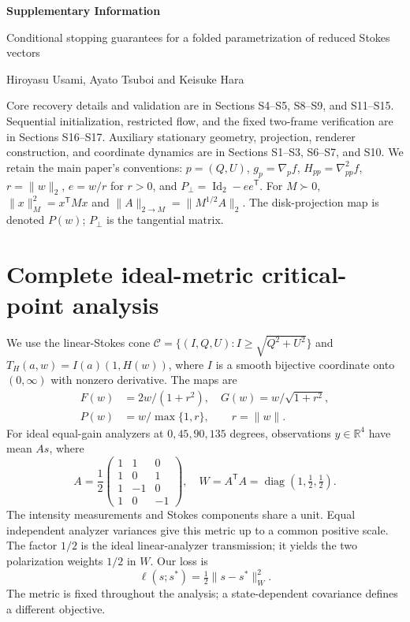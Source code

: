 
\raggedright
\begin{center}
{\Large\bfseries Supplementary Information}\par\medskip
{\large Conditional stopping guarantees for a folded parametrization of reduced Stokes vectors}\par\medskip
Hiroyasu Usami, Ayato Tsuboi and Keisuke Hara
\end{center}
\medskip
\noindent Core recovery details and validation are in Sections S4--S5, S8--S9, and S11--S15. Sequential initialization, restricted flow, and the fixed two-frame verification are in Sections S16--S17. Auxiliary stationary geometry, projection, renderer construction, and coordinate dynamics are in Sections S1--S3, S6--S7, and S10. We retain the main paper's conventions: $p=(Q,U)$, $g_p=\nabla_p f$, $H_{pp}=\nabla^2_{pp}f$, $r=\|w\|_2$, $e=w/r$ for $r>0$, and $P_\perp=\operatorname{Id}_2-ee^{\mathsf T}$. For $M\succ0$, $\|x\|_M^2=x^{\mathsf T}Mx$ and $\|A\|_{2\to M}=\|M^{1/2}A\|_2$. The disk-projection map is denoted $P(w)$; $P_\perp$ is the tangential matrix.

\section{Complete ideal-metric critical-point analysis}
\label{SI-sec:ideal}
We use the linear-Stokes cone $\mathcal C=\{(I,Q,U):I\geq\sqrt{Q^2+U^2}\}$ and $T_H(a,w)=I(a)(1,H(w))$, where $I$ is a smooth bijective coordinate onto $(0,\infty)$ with nonzero derivative. The maps are
\begin{equation}
 \begin{aligned}
 F(w)&=2w/(1+r^2),\quad G(w)=w/\sqrt{1+r^2},\\
 P(w)&=w/\max\{1,r\},\qquad r=\|w\|.
 \end{aligned}
\end{equation}
For ideal equal-gain analyzers at $0,45,90,135$ degrees, observations $y\in\mathbb R^4$ have mean $As$, where
\begin{equation}
 A=\frac12\begin{pmatrix}1&1&0\\1&0&1\\1&-1&0\\1&0&-1\end{pmatrix},
 \quad W=A^\mathsf TA=\operatorname{diag}(1,\tfrac12,\tfrac12).
 \label{SI-eq:analyzer}
\end{equation}
The intensity measurements and Stokes components share a unit. Equal independent analyzer variances give this metric up to a common positive scale. The factor $1/2$ is the ideal linear-analyzer transmission; it yields the two polarization weights $1/2$ in $W$. Our loss is
\begin{equation}
 \ell(s;s^*)=\tfrac12\|s-s^*\|_W^2.
 \label{SI-eq:loss}
\end{equation}
The metric is fixed throughout the analysis; a state-dependent covariance defines a different objective.

